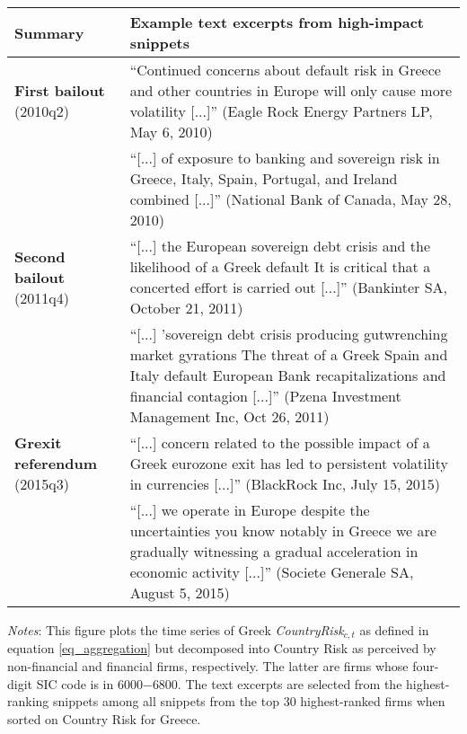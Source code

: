 \documentclass[12pt,oneside,leqno]{article}
\begin{document}
\begin{minipage}[t]{.92\textwidth}
\footnotesize
\begin{tabular}{p{}p{}}
\toprule
Summary & Example text excerpts from high-impact snippets \\\midrule
\textbf{First bailout} \newline (2010q2) & ``Continued concerns about default risk in Greece and other countries in Europe will only cause more volatility [...]'' (Eagle Rock Energy Partners LP, May 6, 2010) \\
& ``[...] of exposure to banking and sovereign risk in Greece, Italy, Spain, Portugal, and Ireland combined [...]'' (National Bank of Canada, May 28, 2010) \\\addlinespace
\textbf{Second bailout} \newline (2011q4) & ``[...] the European sovereign debt crisis and the likelihood of a Greek default It is critical that a concerted effort is carried out [...]'' (Bankinter SA, October 21, 2011) \\
& ``[...] 'sovereign debt crisis producing gutwrenching market gyrations The threat of a Greek Spain and Italy default European Bank recapitalizations and financial contagion [...]'' (Pzena Investment Management Inc, Oct 26, 2011) \\\addlinespace
\textbf{Grexit referendum} (2015q3) & ``[...] concern related to the possible impact of a Greek eurozone exit has led to persistent volatility in currencies [...]'' (BlackRock Inc, July 15, 2015) \\
& ``[...] we operate in Europe despite the uncertainties you know notably in Greece we are gradually witnessing a gradual acceleration in economic activity [...]'' (Societe Generale SA, August 5, 2015) \\\bottomrule
\end{tabular}
\end{minipage}
\vspace{.05in}

\begin{minipage}[t]{.92\textwidth}
\scriptsize\textit{Notes}: This figure plots the time series of Greek \textit{CountryRisk}$_{c,t}$ as defined in equation \eqref{eq_aggregation} but decomposed into Country Risk as perceived by non-financial and financial firms, respectively. The latter are firms whose four-digit SIC code is in 6000$-$6800. The text excerpts are selected from the highest-ranking snippets among all snippets from the top 30 highest-ranked firms when sorted on Country Risk for Greece.
\end{minipage}
\end{document}
